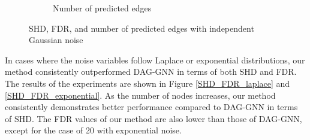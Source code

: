 \documentclass[10pt]{article}
\begin{document}
\begin{figure}[H]
\begin{subfigure}{0.3\textwidth}
        \caption{Number of predicted edges}
        \label{pred_edge_gaussian}
    \end{subfigure}
    \caption{SHD, FDR, and number of predicted edges with independent Gaussian noise}
    \label{SHD_FDR_gaussian}
\end{figure}

In cases where the noise variables follow Laplace or exponential distributions, our method consistently outperformed DAG-GNN in terms of both SHD and FDR. The results of the experiments are shown in Figure \ref*{SHD_FDR_laplace} and \ref*{SHD_FDR_exponential}. As the number of nodes increases, our method consistently demonstrates better performance compared to DAG-GNN in terms of SHD. The FDR values of our method are also lower than those of DAG-GNN, except for the case of 20 with exponential noise.\\
\end{document}
